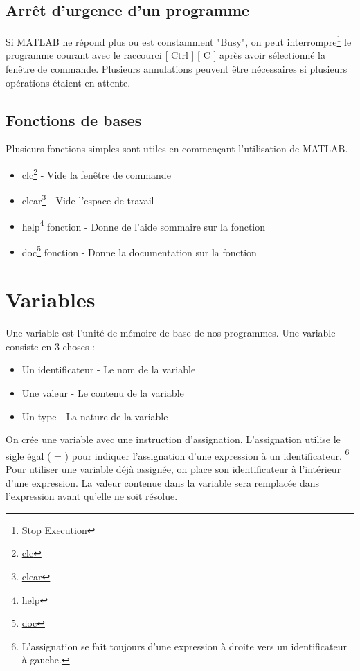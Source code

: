\documentclass{tufte-handout}
\begin{document}
\subsection{Arrêt d'urgence d'un programme}
Si MATLAB ne répond plus ou est constamment "Busy", on peut interrompre\footnote{\href{https://www.mathworks.com/help/matlab/matlab_env/stop-execution.html}{Stop Execution}} le programme courant avec le raccourci [ Ctrl ] [ C ] après avoir sélectionné la fenêtre de commande. Plusieurs annulations peuvent être nécessaires si plusieurs opérations étaient en attente.
\subsection{Fonctions de bases}
Plusieurs fonctions simples sont utiles en commençant l'utilisation de MATLAB.
\begin{itemize}
    \item clc\footnote{\href{https://www.mathworks.com/help/matlab/ref/clc.html}{clc}} - Vide la fenêtre de commande
    \item clear\footnote{\href{https://www.mathworks.com/help/matlab/ref/clear.html}{clear}} - Vide l'espace de travail
    \item help\footnote{\href{https://www.mathworks.com/help/matlab/ref/help.html}{help}} fonction - Donne de l'aide sommaire sur la fonction
    \item doc\footnote{\href{https://www.mathworks.com/help/matlab/ref/doc.html}{doc}} fonction - Donne la documentation sur la fonction
\end{itemize}

\section{Variables}
Une variable est l'unité de mémoire de base de nos programmes. Une variable consiste en 3 choses :
\begin{itemize}
    \item Un identificateur - Le nom de la variable
    \item Une valeur - Le contenu de la variable
    \item Un type - La nature de la variable
\end{itemize}
On crée une variable avec une instruction d'assignation. L'assignation utilise le sigle égal ( = ) pour indiquer l'assignation d'une expression à un identificateur.
\footnote{L'assignation se fait toujours d'une expression à droite vers un identificateur à gauche.}
Pour utiliser une variable déjà assignée, on place son identificateur à l'intérieur d'une expression. La valeur contenue dans la variable sera remplacée dans l'expression avant qu'elle ne soit résolue.
\end{document}
